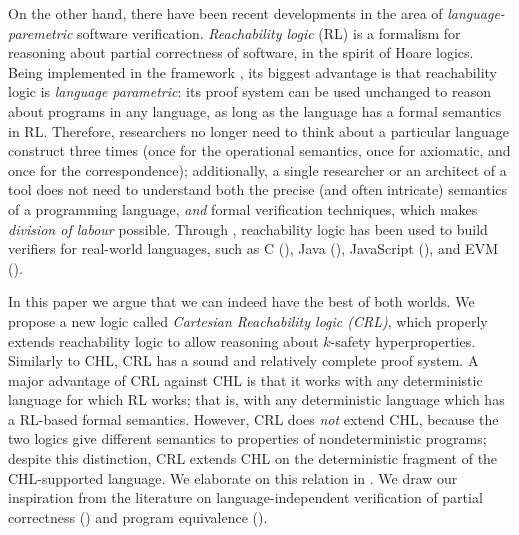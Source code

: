 On the other hand, there have been recent developments in the area of
\emph{language-paremetric} software verification.  \emph{Reachability logic}
(RL) \cite{RosuS12oopsla,RosuSCM13lics,StefanescuCMMSR19} is a formalism for
reasoning about partial correctness of software, in the spirit of Hoare
logics.  Being implemented in the \K{} framework \cite{KVision}, its biggest
advantage is that reachability logic is \emph{language parametric}: its proof
system can be used unchanged to reason about programs in any language, as long
as the language has a formal semantics in RL.  Therefore, researchers no
longer need to think about a particular language construct three times (once
for the operational semantics, once for axiomatic, and once for the
correspondence); additionally, a single researcher or an architect of a tool does not
need to understand both the precise (and often intricate) semantics of a
programming language, \emph{and} formal verification techniques, which makes
\emph{division of labour} possible.  Through \K{}, reachability logic has been
used to build verifiers for real-world languages, such as C (\cite{RVMatch}),
Java (\cite{StefanescuPYLR16VerifiersForAll}), JavaScript
(\cite{StefanescuPYLR16VerifiersForAll}), and EVM
(\cite{KevmVerificationTool}).

In this paper we argue that we can indeed have the best of both worlds.  We
propose a new logic called \emph{Cartesian Reachability logic (CRL)}, which
properly extends reachability logic to allow reasoning about $k$-safety
hyperproperties. Similarly to CHL, CRL has a sound and relatively complete
proof system. A major advantage of CRL against CHL is that it works with any
deterministic
language for which RL works; that is, with any deterministic language which has a RL-based
formal semantics.  However, CRL does \emph{not} extend CHL, because the two
logics give different semantics to properties of nondeterministic programs;
despite this distinction, CRL extends CHL on the deterministic fragment of the
CHL-supported language.  We elaborate on this relation in
.  We draw our inspiration from the literature on
language-independent verification of partial correctness
(\cite{RosuS12oopsla,RosuSCM13lics,StefanescuCMMSR19}) and program equivalence
(\cite{CiobacaLRR16,CiobacaLRR14}).  


